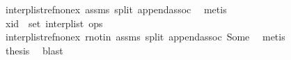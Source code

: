 \begin{isabellebody}
\ interp{\isacharunderscore}list{\isacharunderscore}ref{\isacharunderscore}nonex\ assms{\isacharparenleft}{}{\isacharparenright}\ split\ append{\isachardot}assoc\ \isamarkupfalse%
\ metis\isanewline
\ \ \ \ \ \ \isamarkupfalse%
\ \isamarkupfalse%
\ {\isachardoublequoteopen}xid\ {\isasymnotin}\ set\ {\isacharparenleft}interp{\isacharunderscore}list\ ops{\isacharparenright}{\isachardoublequoteclose}\isanewline
\ \ \ \ \ \ \ \ \isamarkupfalse%
\ interp{\isacharunderscore}list{\isacharunderscore}ref{\isacharunderscore}nonex\ r{\isacharunderscore}notin\ assms{\isacharparenleft}{}{\isacharparenright}\ split\ append{\isachardot}assoc\ Some\ \isamarkupfalse%
\ metis\isanewline
\ \ \ \ \ \ \isamarkupfalse%
\ \isamarkupfalse%
\ {\isacharquery}thesis\ \isamarkupfalse%
\ blast\isanewline
\ \ \ \ \isamarkupfalse%
\isanewline
\ \ \isamarkupfalse%
\isanewline
{}\isamarkupfalse%
%
\endisatagproof
{\isafoldproof}%
%
\isadelimproof
\isanewline
%
\endisadelimproof
%
\isadelimtheory
\isanewline
%
\endisadelimtheory
%
\isatagtheory
{}\isamarkupfalse%
%
\endisatagtheory
{\isafoldtheory}%
%
\isadelimtheory
%
\endisadelimtheory
%
\end{isabellebody}%
